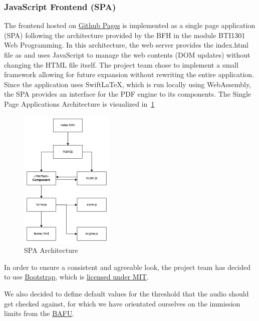 \subsubsection{JavaScript Frontend (SPA)}
The frontend hosted on \href{https://decibel-threshold-event-displayer.github.io/}{Github Pages} is implemented as a single page application (SPA) following the architecture provided by the BFH in the module BTI1301 Web Programming.
In this architecture, the web server provides the index.html file as and uses JavaScript to manage the web contents (DOM updates) without changing the HTML file itself.
The project team chose to implement a small framework allowing for future expansion without rewriting the entire application.
Since the application uses SwiftLaTeX, which is run locally using WebAssembly, the SPA provides an interface for the PDF engine to its components.
The Single Page Applications Architecture is visualized in~\ref{fig:spa-architecture}

\begin{figure}[H]
    \centering
    \includegraphics[width=0.4\textwidth]{../assets/spa_diagram.png}
    \caption{SPA Architecture}\label{fig:spa-architecture}
\end{figure}

In order to ensure a consistent and agreeable look, the project team has decided to use \href{https://getbootstrap.com/}{Bootstrap}, which is \href{https://github.com/twbs/bootstrap/blob/main/LICENSE}{licensed under MIT}.

We also decided to define default values for the threshold that the audio should get checked against,
for which we have orientated ourselves on the immission limits from the \href{https://www.bafu.admin.ch/bafu/de/home/themen/laerm/fachinformationen/laermbelastung/grenzwerte-fuer-laerm/belastungsgrenzwerte-fuer-laerm.html}{BAFU}.

